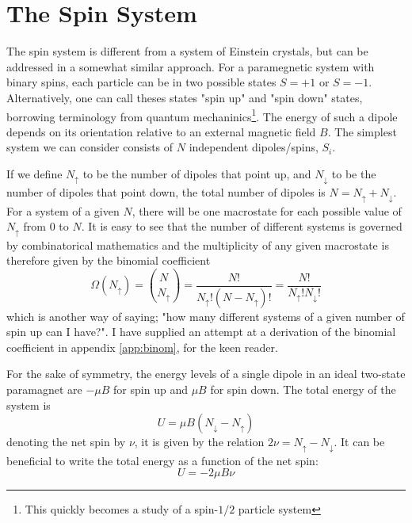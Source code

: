 \documentclass[10pt,a4paper]{amsart}
\begin{document}
\section{The Spin System}
The spin system is different from a system of Einstein crystals, but can be addressed in a somewhat similar approach. For a paramegnetic system with binary spins, each particle can be in two possible states $S=+1$ or $S=-1$. Alternatively, one can call theses states "spin up" and "spin down" states, borrowing terminology from quantum mechaninics\footnote{This quickly becomes a study of a spin-$1/2$ particle system}. The energy of such a dipole depends on its orientation relative to an external magnetic field $B$. The simplest system we can consider consists of $N$ independent dipoles/spins, $S_i$. 

If we define $N_{\uparrow}$ to be the number of dipoles that point up, and $N_{\downarrow}$ to be the number of dipoles that point down, the total number of dipoles is $N=N_{\uparrow}+N_{\downarrow}$. For a system of a given $N$, there will be one macrostate for each possible value of $N_{\uparrow}$ from $0$ to $N$. It is easy to see that the number of different systems is governed by combinatorical mathematics and the multiplicity of any given macrostate is therefore given by the binomial coefficient
\begin{equation}
\Omega(N_{\uparrow}) = \binom{N}{N_{\uparrow}}=\frac{N!}{N_{\uparrow}!(N-N_{\uparrow})!}=\frac{N!}{N_{\uparrow}!N_{\downarrow}!}
\end{equation}
which is another way of saying; "how many different systems of a given number of spin up can I have?". I have supplied an attempt at a derivation of the binomial coefficient in appendix \ref{app:binom}, for the keen reader.

For the sake of symmetry, the energy levels of a single dipole in an ideal two-state paramagnet are $-\mu B$ for spin up and $\mu B$ for spin down. The total energy of the system is
\begin{equation}
U = \mu B(N_{\downarrow}-N_{\uparrow})
\end{equation}
denoting the net spin by $\nu$, it is given by the relation $2\nu = N_{\uparrow}-N_{\downarrow}$. It can be beneficial to write the total energy as a function of the net spin:
\begin{equation}
U = -2\mu B \nu
\end{equation} 
\end{document}
